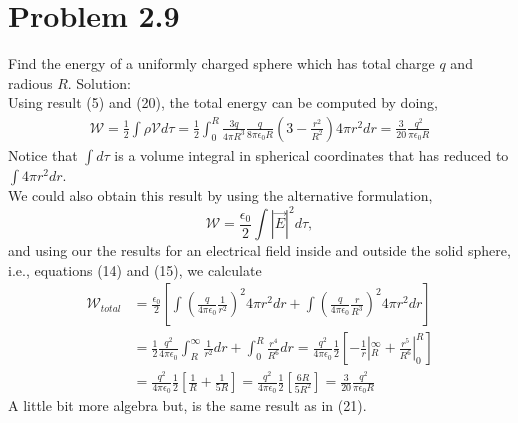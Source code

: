 \section{Problem 2.9}
Find the energy of a uniformly charged sphere which has total charge $q$ and radious $R$. Solution: \\
Using result (5) and (20), the total energy can be computed by doing,
\begin{align}
	\mathcal{W}	= \frac{1}{2} \int\rho\mathcal{V}d\tau 
						= \frac{1}{2} \int_0^R \frac{3 q}{4\pi R^3} 
						  \frac{q}{8\pi\epsilon_0 R}\left(3-\frac{r^2}{R^2}\right) 4\pi r^2 dr 
						= \frac{3}{20}\frac{q^2}{\pi\epsilon_0 R}
\end{align}
Notice that $\int d\tau$ is a volume integral in spherical coordinates that has reduced to $\int 4\pi r^2 dr$. \\ We could also obtain this result by using the alternative formulation,
\begin{equation}
	\mathcal{W} = \frac{\epsilon_0}{2}\int |\vec{E}|^2 d\tau,
\end{equation}
and using our the results for an electrical field inside and outside the solid sphere, i.e., equations (14) and (15), we calculate 
\begin{align}
	\mathcal{W}_{total} 	&= \frac{\epsilon_0}{2} \left[
						\int\left(\frac{q}{4\pi\epsilon_0}\frac{1}{r^2}\right)^2 4\pi r^2dr +
						\int\left(\frac{q}{4\pi\epsilon_0}\frac{r}{R^3}\right)^2 4\pi r^2dr \right]\\
						&= \frac{1}{2} \frac{q^2}{4\pi\epsilon_0} 
						\int_{R}^{\infty}\frac{1}{r^2}dr + \int_{0}^{R}\frac{r^4}{R^6}dr 
						 = \frac{q^2}{4\pi\epsilon_0}\frac{1}{2}
						\left[-\frac{1}{r}|_{R}^{\infty} +\frac{r^5}{R^6}|_{0}^{R}\right]\\
						&= \frac{q^2}{4\pi\epsilon_0}\frac{1}{2}\left[\frac{1}{R}+\frac{1}{5R}\right]
						 = \frac{q^2}{4\pi\epsilon_0}\frac{1}{2}\left[\frac{6R}{5R^2}\right]
						 = \frac{3}{20}\frac{q^2}{\pi\epsilon_0 R}
\end{align}
A little bit more algebra but, is the same result as in (21).

